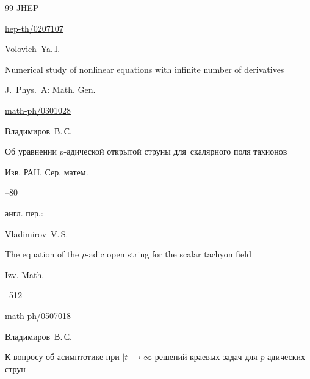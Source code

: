 \begin{thebibliography}{99}
\jour   JHEP 





\arxiv \href{http://arxiv.org/abs/hep-th/0207107}{hep-th/0207107}





\by Volovich~Ya.\,I.

\paper Numerical study of nonlinear equations with infinite number of derivatives

\jour J.~Phys.~A: Math. Gen.





\arxiv \href{http://arxiv.org/abs/math-ph/0301028}{math-ph/0301028}






\by Владимиров~В.\,С.

\paper Об уравнении $p$-адической открытой струны для~скалярного поля тахионов

\jour Изв. РАН. Сер. матем.




--80

\transl

англ. пер.:~

\by Vladimirov~V.\,S.

\paper The equation of the $p$-adic open string for the scalar tachyon field

\jour Izv. Math.




--512

\arxiv \href{http://arxiv.org/abs/math-ph/0507018}{math-ph/0507018}

 




\by Владимиров~В.\,С.

\paper К вопросу об асимптотике при $|t|\to\infty$ решений краевых задач для $p$-адических струн


\end{thebibliography}
